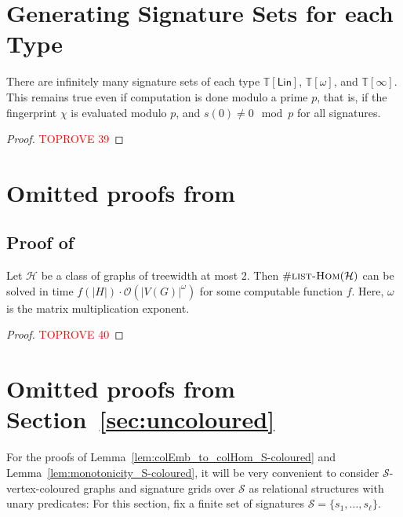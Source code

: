 \documentclass[authorcolumns,numberwithinsect]{no-lipics-v2022}
\newcommand{\listhomsprob}
{\text{\sc{list-Hom}}}
\begin{document}



\newpage

\appendix

\section{Generating Signature Sets for each Type}

\begin{lemma}
    There are infinitely many signature sets of each type $\mathbb{T}[\mathsf{Lin}]$, $\mathbb{T}[\omega]$, and $\mathbb{T}[\infty]$. This remains true even if computation is done modulo a prime $p$, that is, if the fingerprint $\chi$ is evaluated modulo $p$, and $s(0)\neq 0 \mod p$ for all signatures.
\end{lemma}
\begin{proof}\textcolor{red}{TOPROVE 39}\end{proof}

\section{Omitted proofs from }\label{sec:appendix_fastMM}
\subsection{Proof of }\label{lem:AppendixListHomsMatrix}
\begin{lemma}
Let $\mathcal{H}$ be a class of graphs of treewidth at most 2.
Then $\#\listhomsprob(\mathcal{H})$ can be solved in time $f(|H|)\cdot \mathcal{O}(|V(G)|^{\omega})$ for some computable function $f$. Here, $\omega$ is the matrix multiplication exponent.
\end{lemma}
\begin{proof}\textcolor{red}{TOPROVE 40}\end{proof}

\section{Omitted proofs from Section~\ref{sec:uncoloured}}\label{sec:app-uncol}
For the proofs of Lemma~\ref{lem:colEmb_to_colHom_S-coloured} and Lemma~\ref{lem:monotonicity_S-coloured}, it will be very convenient to consider $\mathcal{S}$-vertex-coloured graphs and signature grids over $\mathcal{S}$ as relational structures with unary predicates: For this section, fix a finite set of signatures $\mathcal{S}=\{s_1,\dots,s_\ell\}$. 
\end{document}
